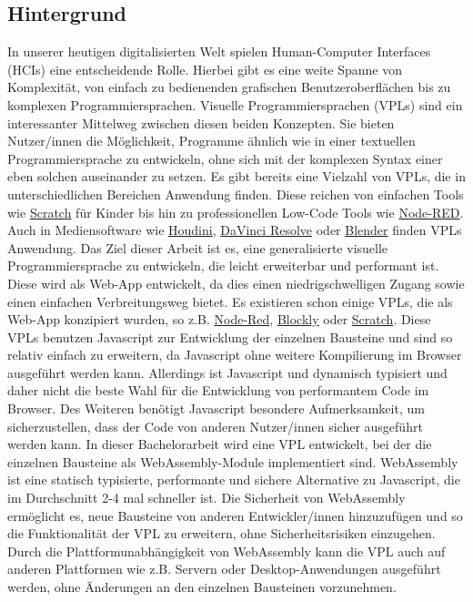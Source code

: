 \documentclass[ngerman]{article}
\begin{document}
\subsection{Hintergrund}
In unserer heutigen digitalisierten Welt spielen Human-Computer Interfaces (HCIs) eine entscheidende Rolle.
Hierbei gibt es eine weite Spanne von Komplexität, von einfach zu bedienenden grafischen Benutzeroberflächen bis zu komplexen Programmiersprachen. 
\br
Visuelle Programmiersprachen (VPLs) sind ein interessanter Mittelweg zwischen diesen beiden Konzepten. Sie bieten Nutzer/innen die Möglichkeit, Programme ähnlich wie in einer textuellen Programmiersprache zu entwickeln, ohne sich mit der komplexen Syntax einer eben solchen auseinander zu setzen.
\br
Es gibt bereits eine Vielzahl von VPLs, die in unterschiedlichen Bereichen Anwendung finden.
Diese reichen von einfachen Tools wie \href{https://scratch.mit.edu/}{Scratch} für Kinder bis hin zu professionellen Low-Code Tools wie \href{https://nodered.org/}{Node-RED}. Auch in Mediensoftware wie \href{https://www.sidefx.com/products/houdini/}{Houdini}, \href{https://www.blackmagicdesign.com/de/products/davinciresolve/}{DaVinci Resolve} oder \href{https://www.blender.org/}{Blender} finden VPLs Anwendung.
\br
Das Ziel dieser Arbeit ist es, eine generalisierte visuelle Programmiersprache zu entwickeln, die leicht erweiterbar und performant ist.
Diese wird als Web-App entwickelt, da dies einen niedrigschwelligen Zugang sowie einen einfachen Verbreitungsweg bietet.
\br
Es existieren schon einige VPLs, die als Web-App konzipiert wurden, so z.B. \href{https://nodered.org}{Node-Red},
\href{https://developers.google.com/blockly}{Blockly} oder \href{https://scratch.mit.edu/}{Scratch}. Diese VPLs benutzen Javascript zur Entwicklung der einzelnen Bausteine und sind so relativ einfach zu erweitern, da Javascript ohne weitere Kompilierung im Browser ausgeführt werden kann. 
Allerdings ist Javascript  und dynamisch typisiert und daher nicht die beste Wahl für die Entwicklung von performantem Code im Browser. Des Weiteren benötigt Javascript besondere Aufmerksamkeit, um sicherzustellen, dass der Code von anderen Nutzer/innen sicher ausgeführt werden kann. 
\br
In dieser Bachelorarbeit wird eine VPL entwickelt, bei der die einzelnen Bausteine als WebAssembly-Module implementiert sind. 
WebAssembly ist eine statisch typisierte, performante und sichere Alternative zu Javascript, die im Durchschnitt 2-4 mal schneller ist. \cite{electronics11193217} \cite{Haas2017} Die Sicherheit von WebAssembly ermöglicht es, neue Bausteine von anderen Entwickler/innen hinzuzufügen und so die Funktionalität der VPL zu erweitern, ohne Sicherheitsrisiken einzugehen. Durch die Plattformunabhängigkeit von WebAssembly kann die VPL auch auf anderen Plattformen wie z.B. Servern oder Desktop-Anwendungen ausgeführt werden, ohne Änderungen an den einzelnen Bausteinen vorzunehmen.
\end{document}
